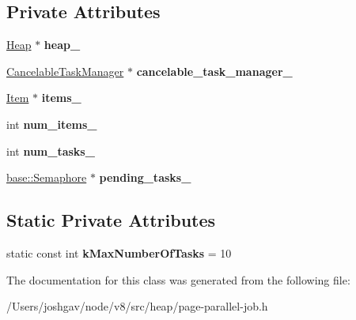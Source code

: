 \subsection*{Private Attributes}
\begin{DoxyCompactItemize}
\item 
\hyperlink{classv8_1_1internal_1_1_heap}{Heap} $\ast$ {\bfseries heap\+\_\+}\hypertarget{classv8_1_1internal_1_1_page_parallel_job_a46cce6332ad23de670c3df7ce7f95647}{}\label{classv8_1_1internal_1_1_page_parallel_job_a46cce6332ad23de670c3df7ce7f95647}

\item 
\hyperlink{classv8_1_1internal_1_1_cancelable_task_manager}{Cancelable\+Task\+Manager} $\ast$ {\bfseries cancelable\+\_\+task\+\_\+manager\+\_\+}\hypertarget{classv8_1_1internal_1_1_page_parallel_job_a53e3adecfbef71931d24ebbb4ac9f1f5}{}\label{classv8_1_1internal_1_1_page_parallel_job_a53e3adecfbef71931d24ebbb4ac9f1f5}

\item 
\hyperlink{structv8_1_1internal_1_1_page_parallel_job_1_1_item}{Item} $\ast$ {\bfseries items\+\_\+}\hypertarget{classv8_1_1internal_1_1_page_parallel_job_a191ff6f00ad72de1fe33b1a9076cc714}{}\label{classv8_1_1internal_1_1_page_parallel_job_a191ff6f00ad72de1fe33b1a9076cc714}

\item 
int {\bfseries num\+\_\+items\+\_\+}\hypertarget{classv8_1_1internal_1_1_page_parallel_job_a2650d606c70217499edb8f452cac01ec}{}\label{classv8_1_1internal_1_1_page_parallel_job_a2650d606c70217499edb8f452cac01ec}

\item 
int {\bfseries num\+\_\+tasks\+\_\+}\hypertarget{classv8_1_1internal_1_1_page_parallel_job_a68bf926a82495abd8529240b2a50fef5}{}\label{classv8_1_1internal_1_1_page_parallel_job_a68bf926a82495abd8529240b2a50fef5}

\item 
\hyperlink{classv8_1_1base_1_1_semaphore}{base\+::\+Semaphore} $\ast$ {\bfseries pending\+\_\+tasks\+\_\+}\hypertarget{classv8_1_1internal_1_1_page_parallel_job_a44f93644808381084e6ed639d4feeefe}{}\label{classv8_1_1internal_1_1_page_parallel_job_a44f93644808381084e6ed639d4feeefe}

\end{DoxyCompactItemize}
\subsection*{Static Private Attributes}
\begin{DoxyCompactItemize}
\item 
static const int {\bfseries k\+Max\+Number\+Of\+Tasks} = 10\hypertarget{classv8_1_1internal_1_1_page_parallel_job_a380add603d565b4b61dd8d612e6c9f0c}{}\label{classv8_1_1internal_1_1_page_parallel_job_a380add603d565b4b61dd8d612e6c9f0c}

\end{DoxyCompactItemize}


The documentation for this class was generated from the following file\+:\begin{DoxyCompactItemize}
\item 
/\+Users/joshgav/node/v8/src/heap/page-\/parallel-\/job.\+h\end{DoxyCompactItemize}
